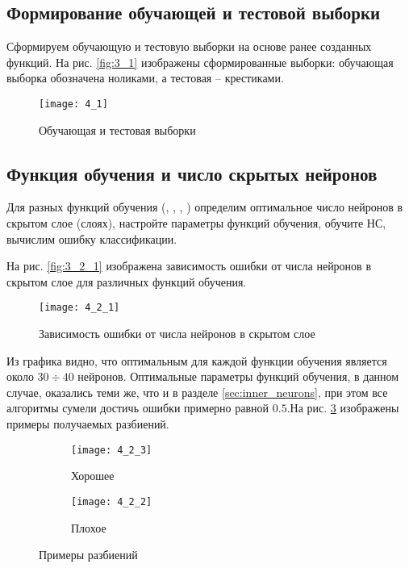 \subsection{Формирование обучающей и тестовой выборки}

Сформируем обучающую и тестовую выборки на основе ранее созданных функций. На рис. \ref{fig:3_1} изображены сформированные выборки: обучающая выборка обозначена ноликами, а тестовая -- крестиками.
\begin{figure}[H]
\begin{center}
	\texttt{[image: 4\_1]}
	\caption{Обучающая и тестовая выборки}
	\label{fig:4_1}
\end{center}
\end{figure}

\subsection{Функция обучения и число скрытых нейронов}

Для разных функций обучения (, , , ) определим оптимальное число нейронов в скрытом слое (слоях), настройте параметры функций обучения, обучите НС, вычислим ошибку классификации.

На рис. \ref{fig:3_2_1} изображена зависимость ошибки от числа нейронов в скрытом слое для различных функций обучения.
\begin{figure}[H]
\begin{center}
	\texttt{[image: 4\_2\_1]}
	\caption{Зависимость ошибки от числа нейронов в скрытом слое}
	\label{fig:4_2_1}
\end{center}
\end{figure}
Из графика видно, что оптимальным для каждой функции обучения является около $30 \div 40$ нейронов. Оптимальные параметры функций обучения, в данном случае, оказались теми же, что и в разделе \ref{sec:inner_neurons}, при этом  все алгоритмы сумели достичь ошибки  примерно равной $0.5$.На рис. \ref{fig:4_2} изображены примеры получаемых разбиений.
\begin{figure}[H]
\begin{center}
	\begin{subfigure}[b]{0.49\textwidth}
		\texttt{[image: 4\_2\_3]}
		\caption{Хорошее}
	\end{subfigure}
	\begin{subfigure}[b]{0.49\textwidth}
		\texttt{[image: 4\_2\_2]}
		\caption{Плохое}
	\end{subfigure}
	\caption{Примеры разбиений}
	\label{fig:4_2}
\end{center}
\end{figure}

